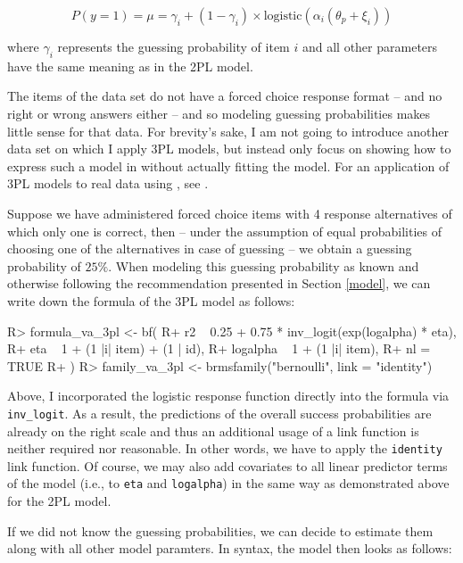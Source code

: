 \documentclass[
]{jss}
\begin{document}
\[
P(y = 1) = \mu = \gamma_i + (1 - \gamma_i) \times \text{logistic}(\alpha_i (\theta_p + \xi_i))
\]

where \(\gamma_i\) represents the guessing probability of item \(i\) and
all other parameters have the same meaning as in the 2PL model.

The items of the  data set do not have a forced choice
response format -- and no right or wrong answers either -- and so
modeling guessing probabilities makes little sense for that data. For
brevity's sake, I am not going to introduce another data set on which I
apply 3PL models, but instead only focus on showing how to express such
a model in  without actually fitting the model. For an
application of 3PL models to real data using , see
\citet{buerkner2020spm}.

Suppose we have administered forced choice items with 4 response
alternatives of which only one is correct, then -- under the assumption
of equal probabilities of choosing one of the alternatives in case of
guessing -- we obtain a guessing probability of \(25\%\). When modeling
this guessing probability as known and otherwise following the
recommendation presented in Section \ref{model}, we can write down the
formula of the 3PL model as follows:

\begin{CodeChunk}

\begin{CodeInput}
R> formula_va_3pl <- bf(
R+   r2 ~ 0.25 + 0.75 * inv_logit(exp(logalpha) * eta),
R+   eta ~ 1 + (1 |i| item) + (1 | id),
R+   logalpha ~ 1 + (1 |i| item),
R+   nl = TRUE
R+ )
R> family_va_3pl <- brmsfamily("bernoulli", link = "identity")
\end{CodeInput}
\end{CodeChunk}

Above, I incorporated the logistic response function directly into the
formula via \texttt{inv\_logit}. As a result, the predictions of the
overall success probabilities are already on the right scale and thus an
additional usage of a link function is neither required nor reasonable.
In other words, we have to apply the \texttt{identity} link function. Of
course, we may also add covariates to all linear predictor terms of the
model (i.e., to \texttt{eta} and \texttt{logalpha}) in the same way as
demonstrated above for the 2PL model.

If we did not know the guessing probabilities, we can decide to estimate
them along with all other model paramters. In  syntax, the
model then looks as follows:
\end{document}
